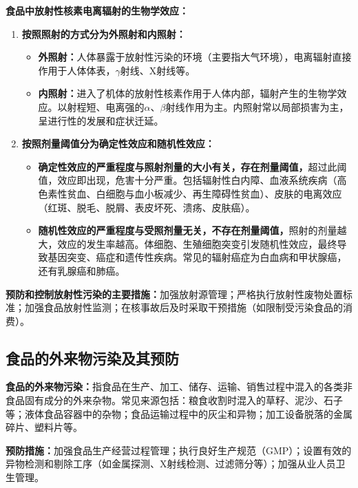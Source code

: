 \begin{defbox}
\textbf{食品中放射性核素电离辐射的生物学效应：}
\begin{enumerate}[leftmargin=*]
    \item \textbf{按照照射的方式分为外照射和内照射：}
    \begin{itemize}
        \item \textbf{外照射：}人体暴露于放射性污染的环境（主要指大气环境），电离辐射直接作用于人体体表，$\gamma$射线、X射线等。
        \item \textbf{内照射：}进入了机体的放射性核素作用于人体内部，辐射产生的生物学效应。以射程短、电离强的$\alpha$、$\beta$射线作用为主。内照射常以局部损害为主，呈进行性的发展和症状迁延。
    \end{itemize}
    \item \textbf{按照剂量阈值分为确定性效应和随机性效应：}
    \begin{itemize}
        \item \textbf{确定性效应的严重程度与照射剂量的大小有关，存在剂量阈值，}超过此阈值，效应即出现，危害十分严重。包括辐射性白内障、血液系统疾病（高色素性贫血、白细胞与血小板减少、再生障碍性贫血）、皮肤的电离效应（红斑、脱毛、脱屑、表皮坏死、溃疡、皮肤癌）。
        \item \textbf{随机性效应的严重程度与受照剂量无关，不存在剂量阈值，}照射的剂量越大，效应的发生率越高。体细胞、生殖细胞突变引发随机性效应，最终导致基因突变、癌症和遗传性疾病。常见的辐射癌症为白血病和甲状腺癌，还有乳腺癌和肺癌。
    \end{itemize}
\end{enumerate}

\textbf{预防和控制放射性污染的主要措施：}加强放射源管理；严格执行放射性废物处置标准；加强食品放射性监测；在核事故后及时采取干预措施（如限制受污染食品的消费）。
\end{defbox}

\subsection{食品的外来物污染及其预防}

\begin{defbox}
\textbf{食品的外来物污染：}指食品在生产、加工、储存、运输、销售过程中混入的各类非食品固有成分的外来杂物。常见来源包括：粮食收割时混入的草籽、泥沙、石子等；液体食品容器中的杂物；食品运输过程中的灰尘和异物；加工设备脱落的金属碎片、塑料片等。

\textbf{预防措施：}加强食品生产经营过程管理；执行良好生产规范（GMP）；设置有效的异物检测和剔除工序（如金属探测、X射线检测、过滤筛分等）；加强从业人员卫生管理。
\end{defbox}

